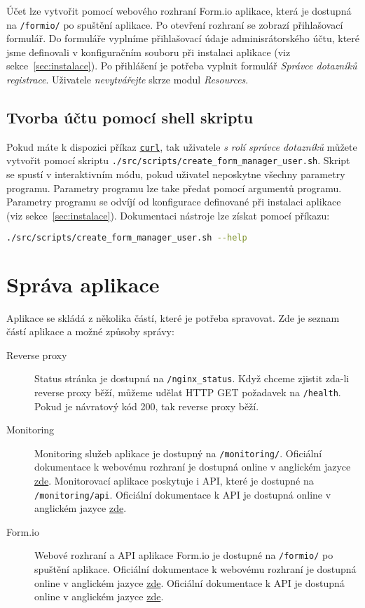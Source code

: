 Účet lze vytvořit pomocí webového rozhraní Form.io aplikace, která je dostupná na \lstinline{/formio/} po spuštění aplikace.
Po otevření rozhraní se zobrazí přihlašovací formulář.
Do formuláře vyplníme přihlašovací údaje adminisrátorského účtu, které jsme definovali v konfiguračním souboru při instalaci aplikace (viz sekce~\ref{sec:instalace}).
Po přihlášení je potřeba vyplnit formulář \textit{Správce dotazníků registrace}.
Uživatele \textit{nevytvářejte} skrze modul \textit{Resources}.

\subsection{Tvorba účtu pomocí shell skriptu}\label{subsec:tvorba-uctu-pomoci-shell-skriptu}

Pokud máte k dispozici příkaz \href{https://curl.se/}{\lstinline{curl}}, tak uživatele \textit{s rolí správce dotazníků} můžete vytvořit pomocí skriptu \lstinline{./src/scripts/create_form_manager_user.sh}. %
Skript se spustí v interaktivním módu, pokud uživatel neposkytne všechny parametry programu.
Parametry programu lze take předat pomocí argumentů programu.
Parametry programu se odvíjí od konfigurace definované při instalaci aplikace (viz sekce~\ref{sec:instalace}).
Dokumentaci nástroje lze získat pomocí příkazu:

\begin{lstlisting}[language=bash]
./src/scripts/create_form_manager_user.sh --help
\end{lstlisting}


\section{Správa aplikace}\label{sec:sprava-aplikace}

Aplikace se skládá z několika částí, které je potřeba spravovat.
Zde je seznam částí aplikace a možné způsoby správy:

\begin{description}
    \item[Reverse proxy] Status stránka je dostupná na \lstinline{/nginx_status}.
    Když chceme zjistit zda-li reverse proxy běží, můžeme udělat HTTP GET požadavek na \lstinline{/health}.
    Pokud je návratový kód 200, tak reverse proxy běží.
    \item[Monitoring] Monitoring služeb aplikace je dostupný na \lstinline{/monitoring/}.
    Oficiální dokumentace k webovému rozhraní je dostupná online v anglickém jazyce \href{https://github.com/google/cadvisor/blob/master/docs/web.md}{zde}.
    Monitorovací aplikace poskytuje i API, které je dostupné na \lstinline{/monitoring/api}.
    Oficiální dokumentace k API je dostupná online v anglickém jazyce \href{https://github.com/google/cadvisor/blob/master/docs/api.md}{zde}.
    \item[Form.io] Webové rozhraní a API aplikace Form.io je dostupné na \lstinline{/formio/} po spuštění aplikace.
    Oficiální dokumentace k webovému rozhraní je dostupná online v anglickém jazyce \href{https://help.form.io/}{zde}.
    Oficiální dokumentace k API je dostupná online v anglickém jazyce \href{https://apidocs.form.io/}{zde}.
\end{description}


